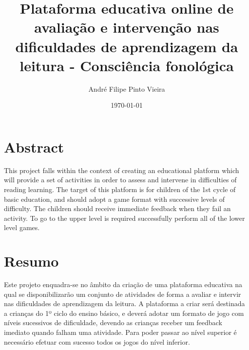 \documentclass[
  oneside,
  11pt, a4paper,
  footinclude=true,
  headinclude=true,
  cleardoublepage=empty
]{scrbook}
\title{Plataforma educativa online de avaliação e intervenção nas dificuldades de aprendizagem da leitura - Consciência fonológica}
\author{André Filipe Pinto Vieira}
\date{\today}
\begin{document}
  
    
\sf
  \thispagestyle{empty}
  
\rm
  \cleardoublepage


  \cleardoublepage
  
\chapter*{Abstract}
  This project falls within the context of creating an educational platform which will provide a set of activities in order to assess and intervene in difficulties of reading learning. The target of this platform is for children of the 1st cycle of basic education, and should adopt a game format with successive levels of difficulty. The children should receive immediate feedback when they fail an activity. To go to the upper level is required successfully perform all of the lower level games.

  \cleardoublepage

\chapter*{Resumo}
  Este projeto enquadra-se no âmbito da criação de uma plataforma educativa na qual se disponibilizarão um conjunto de atividades de forma a avaliar e intervir nas dificuldades de aprendizagem da leitura. A plataforma a criar será destinada a crianças do 1º ciclo do ensino básico, e deverá adotar um formato de jogo com níveis sucessivos de dificuldade, devendo as crianças receber um feedback imediato quando falham uma atividade. Para poder passar ao nível superior é necessário efetuar com sucesso todos os jogos do nível inferior.

  \cleardoublepage
  
  \setcounter{page}{3}
  \rm
  
  \cleardoublepage
  \tableofcontents
  
\end{document}
